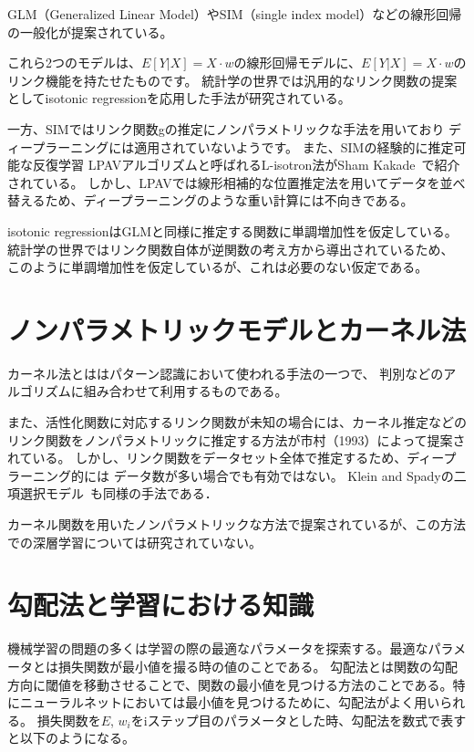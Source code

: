 GLM（Generalized Linear Model）やSIM（single index model）などの線形回帰の一般化が提案されている。

これら2つのモデルは、$ E[Y|X]=X\cdot w $の線形回帰モデルに、$ E[Y|X]=X\cdot w $のリンク機能を持たせたものです。 
統計学の世界では汎用的なリンク関数の提案としてisotonic regressionを応用した手法が研究されている。


 一方、SIMではリンク関数gの推定にノンパラメトリックな手法を用いており ディープラーニングには適用されていないようです。
 また、SIMの経験的に推定可能な反復学習 LPAVアルゴリズムと呼ばれるL-isotron法がSham Kakade~\cite{efficient_sim}で紹介されている。 
 しかし、LPAVでは線形相補的な位置推定法を用いてデータを並べ替えるため、ディープラーニングのような重い計算には不向きである。 

isotonic regressionはGLMと同様に推定する関数に単調増加性を仮定している。統計学の世界ではリンク関数自体が逆関数の考え方から導出されているため、
このように単調増加性を仮定しているが、これは必要のない仮定である。

\section{ノンパラメトリックモデルとカーネル法}

カーネル法とははパターン認識において使われる手法の一つで、 判別などのアルゴリズムに組み合わせて利用するものである。

 また、活性化関数に対応するリンク関数が未知の場合には、カーネル推定などのリンク関数をノンパラメトリックに推定する方法が市村（1993）によって提案されている。
 しかし、リンク関数をデータセット全体で推定するため、ディープラーニング的には データ数が多い場合でも有効ではない。
 Klein and Spadyの二項選択モデル~\cite{klein}も同様の手法である．

 カーネル関数を用いたノンパラメトリックな方法で提案されているが、この方法での深層学習については研究されていない。




\section{勾配法と学習における知識}
機械学習の問題の多くは学習の際の最適なパラメータを探索する。最適なパラメータとは損失関数が最小値を撮る時の値のことである。
勾配法とは関数の勾配方向に閾値を移動させることで、関数の最小値を見つける方法のことである。特にニューラルネットにおいては最小値を見つけるために、勾配法がよく用いられる。
損失関数を$ E $, $ w_i $をiステップ目のパラメータとした時、勾配法を数式で表すと以下のようになる。

